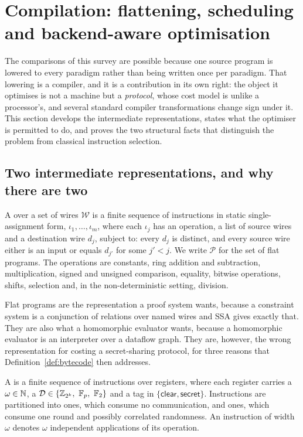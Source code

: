 \section{Compilation: flattening, scheduling and backend-aware optimisation}
\label{sec:compiler}

The comparisons of this survey are possible because one source program is lowered
to every paradigm rather than being written once per paradigm. That lowering is a
compiler, and it is a contribution in its own right: the object it optimises is
not a machine but a \emph{protocol}, whose cost model is unlike a processor's, and
several standard compiler transformations change sign under it. This section
develops the intermediate representations, states what the optimiser is permitted
to do, and proves the two structural facts that distinguish the problem from
classical instruction selection.

\subsection{Two intermediate representations, and why there are two}
\label{sec:compiler:ir}

\begin{definition}
\label{def:flatop}
A  over a set of wires $\mathcal{W}$ is a finite sequence of
instructions in static single-assignment form,
$\iota_1,\dots,\iota_m$, where each $\iota_j$ has an operation, a list of source
wires and a destination wire $d_j$, subject to: every $d_j$ is distinct, and every
source wire either is an input or equals $d_{j'}$ for some $j' < j$. We write
$\mathcal{P}$ for the set of flat programs. The operations are constants, ring
addition and subtraction, multiplication, signed and unsigned comparison,
equality, bitwise operations, shifts, selection and, in the non-deterministic
setting, division.
\end{definition}

Flat programs are the representation a proof system wants, because a constraint
system is a conjunction of relations over named wires and SSA gives exactly that.
They are also what a homomorphic evaluator wants, because a homomorphic evaluator
is an interpreter over a dataflow graph. They are, however, the wrong
representation for costing a secret-sharing protocol, for three reasons that
Definition~\ref{def:bytecode} then addresses.

\begin{definition}
\label{def:bytecode}
A  is a finite sequence of instructions over
registers, where each register carries a  $\omega \in \mathbb{N}$, a
 $\mathcal{D} \in \{\Z_{2^k},\ \mathbb{F}_p,\ \mathbb{F}_2\}$ and a
 tag in $\{\textsf{clear},\textsf{secret}\}$. Instructions are
partitioned into  ones, which consume no communication, and
 ones, which consume one round and possibly correlated
randomness. An instruction of width $\omega$ denotes $\omega$ independent
applications of its operation.
\end{definition}

